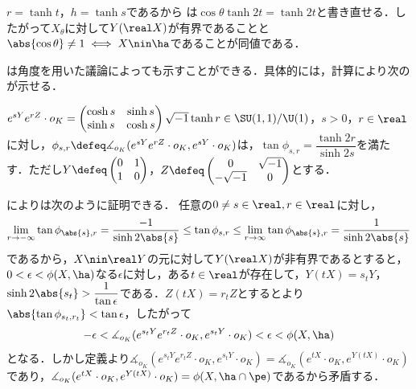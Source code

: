 \begin{npfwn}
  $r = \tanh t$，$h = \tanh s$であるから は$\cos\theta \tanh 2t = \tanh 2t $と書き直せる．したがって$X_{\theta}$に対して$Y(\real X) $が有界であることと$ \abs{\cos\theta}\neq 1 \iff  X\nin \ha  $であることが同値である．
\end{npfwn}

\begin{rem}\label{rem:su11-by-angle}

  は角度を用いた議論によっても示すことができる．具体的には，計算により次のが示せる．
  \begin{lem}\label{lem:0106}
    $e^{sY}e^{rZ}\cdot o_K =
    \begin{pmatrix}
      \cosh s & \sinh s\\ \sinh s & \cosh s
    \end{pmatrix}
    \sqrt{-1}\tanh r \in \SU(1,1)/\U(1) $，$s > 0$，$r\in \real$に対し，$\phi_{s,r}\defeq \measuredangle_{o_K}(e^{sY}e^{rZ}\cdot o_K, e^{sY}\cdot o_K) $は，$\tan \phi_{s,r} = \dfrac{\tanh 2r}{\sinh 2s} $を満たす．ただし$Y \defeq
  \begin{pmatrix}
    0 & 1\\ 1 & 0
  \end{pmatrix}
  $，$Z \defeq \begin{pmatrix}
    0 & \sqrt{-1} \\ -\sqrt{-1} & 0
  \end{pmatrix}$とする．
  \end{lem}  

  によりは次のように証明できる．
  任意の$0\neq s\in \real, r\in \real $に対し，
  \begin{align}
    \lim_{r\to -\infty}\tan \phi_{\abs{s},r} = \dfrac{-1}{\sinh 2\abs{s}}  \leq \tan \phi_{s,r} \leq  \lim_{r\to \infty}\tan \phi_{\abs{s},r} = \dfrac{1}{\sinh 2\abs{s}}\label{eq:0106}
  \end{align}
  であるから，$X\nin \real Y $の元に対して$Y(\real X) $が非有界であるとすると，$ 0 <  \epsilon < \phi(X,\ha)$なる$\epsilon$に対し，ある$t\in \real $が存在して，$Y(tX) = s_tY $，$\sinh 2\abs{s_t} > \dfrac{1}{\tan \epsilon} $である．$Z(tX) = r_tZ $とするとより$\abs{\tan \phi_{s_t,r_t}} < \tan \epsilon $，したがって
  \begin{align*}
    -\epsilon < \measuredangle_{o_K}(e^{s_tY}e^{r_t Z}\cdot o_K, e^{s_tY}\cdot o_K) < \epsilon < \phi(X,\ha)
  \end{align*}
  となる．しかし定義より$\measuredangle_{o_K}(e^{s_tY}e^{r_t Z}\cdot o_K, e^{s_tY}\cdot o_K) = \measuredangle_{o_K}(e^{tX}\cdot o_K, e^{Y(tX) }\cdot o_K) $であり，$\measuredangle_{o_K}(e^{tX}\cdot o_K, e^{Y(tX) }\cdot o_K) = \phi(X,\ha\cap\pe)$であるから矛盾する． 

  
\end{rem}

